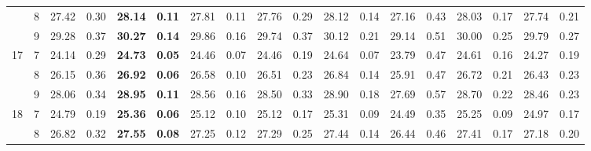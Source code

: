 \documentclass[conference]{IEEEtran}
\begin{document}
\begin{table}[]
\begin{tabular}{|cc|ll|ll|ll|ll|ll|ll|ll|ll|}
		\multicolumn{1}{|c|}{} & 8 & \multicolumn{1}{l|}{27.42} & 0.30 & \multicolumn{1}{l|}{\textbf{28.14}} & \textbf{0.11} & \multicolumn{1}{l|}{27.81} & 0.11 & \multicolumn{1}{l|}{27.76} & 0.29 & \multicolumn{1}{l|}{28.12} & 0.14 & \multicolumn{1}{l|}{27.16} & 0.43 & \multicolumn{1}{l|}{28.03} & 0.17 & \multicolumn{1}{l|}{27.74} & 0.21 \\ \cline{2-18} 
		\multicolumn{1}{|c|}{} & 9 & \multicolumn{1}{l|}{29.28} & 0.37 & \multicolumn{1}{l|}{\textbf{30.27}} & \textbf{0.14} & \multicolumn{1}{l|}{29.86} & 0.16 & \multicolumn{1}{l|}{29.74} & 0.37 & \multicolumn{1}{l|}{30.12} & 0.21 & \multicolumn{1}{l|}{29.14} & 0.51 & \multicolumn{1}{l|}{30.00} & 0.25 & \multicolumn{1}{l|}{29.79} & 0.27 \\ \hline
		\multicolumn{1}{|c|}{\multirow{3}{*}{17}} & 7 & \multicolumn{1}{l|}{24.14} & 0.29 & \multicolumn{1}{l|}{\textbf{24.73}} & \textbf{0.05} & \multicolumn{1}{l|}{24.46} & 0.07 & \multicolumn{1}{l|}{24.46} & 0.19 & \multicolumn{1}{l|}{24.64} & 0.07 & \multicolumn{1}{l|}{23.79} & 0.47 & \multicolumn{1}{l|}{24.61} & 0.16 & \multicolumn{1}{l|}{24.27} & 0.19 \\ \cline{2-18} 
		\multicolumn{1}{|c|}{} & 8 & \multicolumn{1}{l|}{26.15} & 0.36 & \multicolumn{1}{l|}{\textbf{26.92}} & \textbf{0.06} & \multicolumn{1}{l|}{26.58} & 0.10 & \multicolumn{1}{l|}{26.51} & 0.23 & \multicolumn{1}{l|}{26.84} & 0.14 & \multicolumn{1}{l|}{25.91} & 0.47 & \multicolumn{1}{l|}{26.72} & 0.21 & \multicolumn{1}{l|}{26.43} & 0.23 \\ \cline{2-18} 
		\multicolumn{1}{|c|}{} & 9 & \multicolumn{1}{l|}{28.06} & 0.34 & \multicolumn{1}{l|}{\textbf{28.95}} & \textbf{0.11} & \multicolumn{1}{l|}{28.56} & 0.16 & \multicolumn{1}{l|}{28.50} & 0.33 & \multicolumn{1}{l|}{28.90} & 0.18 & \multicolumn{1}{l|}{27.69} & 0.57 & \multicolumn{1}{l|}{28.70} & 0.22 & \multicolumn{1}{l|}{28.46} & 0.23 \\ \hline
		\multicolumn{1}{|c|}{\multirow{3}{*}{18}} & 7 & \multicolumn{1}{l|}{24.79} & 0.19 & \multicolumn{1}{l|}{\textbf{25.36}} & \textbf{0.06} & \multicolumn{1}{l|}{25.12} & 0.10 & \multicolumn{1}{l|}{25.12} & 0.17 & \multicolumn{1}{l|}{25.31} & 0.09 & \multicolumn{1}{l|}{24.49} & 0.35 & \multicolumn{1}{l|}{25.25} & 0.09 & \multicolumn{1}{l|}{24.97} & 0.17 \\ \cline{2-18} 
		\multicolumn{1}{|c|}{} & 8 & \multicolumn{1}{l|}{26.82} & 0.32 & \multicolumn{1}{l|}{\textbf{27.55}} & \textbf{0.08} & \multicolumn{1}{l|}{27.25} & 0.12 & \multicolumn{1}{l|}{27.29} & 0.25 & \multicolumn{1}{l|}{27.44} & 0.14 & \multicolumn{1}{l|}{26.44} & 0.46 & \multicolumn{1}{l|}{27.41} & 0.17 & \multicolumn{1}{l|}{27.18} & 0.20 \\ \cline{2-18} 

\end{tabular}
\end{table}
\end{document}
